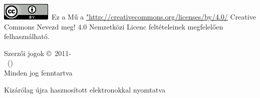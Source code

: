 {   %
\includegraphics{../../common/images/CC88x31}\  Ez a Mű a \url{"http://creativecommons.org/licenses/by/4.0/} Creative Commons Nevezd meg! 4.0 Nemzetközi Licenc feltételeinek megfelelően felhasználható.
  
  \textcopyright{} Szerzői jogok \copyright\ 2011-\the\year\\ \LectureAuthor\ (\LectureEmail) \\
  Minden jog fenntartva

 Kizárólag újra hasznosított elektronokkal nyomtatva

  }
